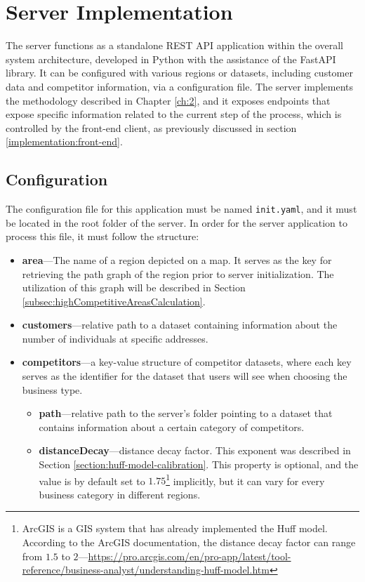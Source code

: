 \newpage

\section{Server Implementation}

The server functions as a standalone REST API application within the overall system architecture, developed in Python with the assistance of the FastAPI library. It can be configured with various regions or datasets, including customer data and competitor information, via a configuration file. The server implements the methodology described in Chapter \ref{ch:2}, and it exposes endpoints that expose specific information related to the current step of the process, which is controlled by the front-end client, as previously discussed in section \ref{implementation:front-end}.

\subsection{Configuration}
\label{section:configuration}

The configuration file for this application must be named \texttt{init.yaml}, and it must be located in the root folder of the server. In order for the server application to process this file, it must follow the structure:

\begin{itemize}
    \item \textbf{area}---The name of a region depicted on a map. It serves as the key for retrieving the path graph of the region prior to server initialization. The utilization of this graph will be described in Section \ref{subsec:highCompetitiveAreasCalculation}.
    \item \textbf{customers}---relative path to a dataset containing information about the number of individuals at specific addresses.
    \item \textbf{competitors}---a key-value structure of competitor datasets, where each key serves as the identifier for the dataset that users will see when choosing the business type.
    \begin{itemize}
        \item \textbf{path}---relative path to the server's folder pointing to a dataset that contains information about a certain category of competitors.
        \item \textbf{distanceDecay}---distance decay factor. This exponent was described in Section \ref{section:huff-model-calibration}. This property is optional, and the value is by default set to $1.75$\footnote{ArcGIS is a GIS system that has already implemented the Huff model. According to the ArcGIS documentation, the distance decay factor can range from $1.5$ to $2$---\url{https://pro.arcgis.com/en/pro-app/latest/tool-reference/business-analyst/understanding-huff-model.htm}} implicitly, but it can vary for every business category in different regions.
    \end{itemize}
\end{itemize}

